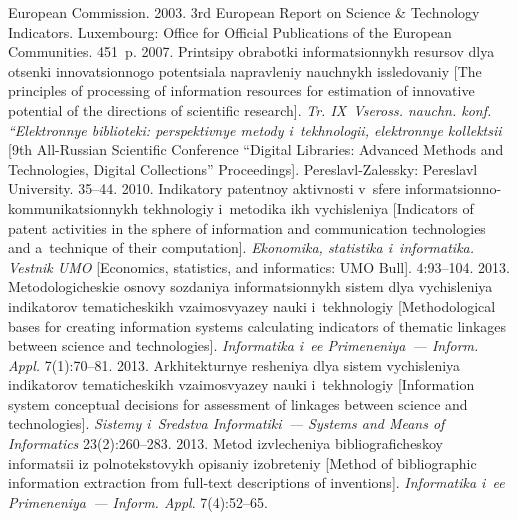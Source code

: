 \begin{multicols}{2}
{{\begin{thebibliography}{99}
European Commission. 2003. {3rd European Report on Science \& Technology Indicators}. 
Luxembourg: Office for Official Publications of the European Communities. 
451~p.
 2007. Printsipy obrabotki 
informatsionnykh resursov dlya otsenki innovatsionnogo potentsiala 
napravleniy nauchnykh issledovaniy [The principles of processing of 
information resources for estimation of innovative potential of the directions 
of scientific research]. \textit{Tr. IX~Vseross. nauchn. konf. 
``Elektronnye biblioteki: perspektivnye metody i~tekhnologii, elektronnye 
kollektsii} [9th All-Russian Scientific Conference ``Digital 
Libraries: Advanced Methods and Technologies, Digital Collections'' 
Proceedings]. Pereslavl-Zalessky: Pereslavl University.  
35--44.
 2010. 
Indikatory patentnoy aktivnosti v~sfere\linebreak  
in\-for\-ma\-tsi\-on\-no-kom\-mu\-ni\-ka\-tsi\-on\-nykh tekhnologiy i~me\-to\-di\-ka ikh 
vychisleniya [Indicators of patent activities in the sphere of information and 
communication technologies and a~technique of their computation]. 
\textit{Ekonomika, statistika i~informatika. Vestnik UMO} [Economics, 
statistics, and informatics: UMO Bull]. 4:93--104.
 2013. Metodologicheskie osnovy so\-zda\-niya 
informatsionnykh sistem dlya vychisleniya indikatorov tematicheskikh 
vzaimosvyazey nauki i~tekhnologiy [Methodological bases for creating 
information systems calculating indicators of thematic linkages between 
science and technologies]. \textit{Informatika i~ee Primeneniya~--- Inform. 
Appl.} 7(1):70--81.
 2013. Arkhitekturnye resheniya dlya sistem vychisleniya 
indikatorov tematicheskikh vzaimo\-svya\-zey nauki i~tekhnologiy [Information 
system conceptual decisions for assessment of linkages between science and 
technologies]. \textit{Sistemy i~Sredstva Informatiki~--- Systems and Means 
of Informatics} 23(2):260--283.
 2013. 
Metod izvlecheniya bibliograficheskoy informatsii iz polnotekstovykh 
opisaniy izobreteniy [Method of bibliographic information extraction  from 
full-text descriptions of inventions]. \textit{Informatika i~ee Primeneniya~--- 
Inform. Appl}. 7(4):52--65.

\end{thebibliography}}}
\end{multicols}
